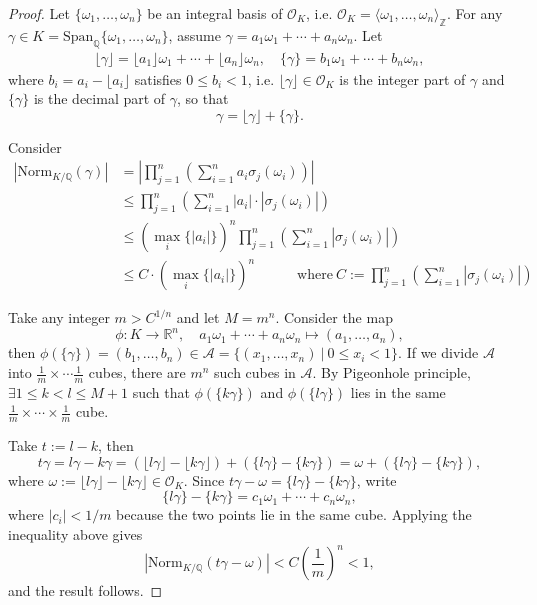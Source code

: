 \begin{proof}
    Let $\{\omega_{1},\dots, \omega_{n}\}$ be an integral basis of $\mathcal{O}_{K}$, i.e. $\mathcal{O}_{K}=\langle \omega_{1},\dots, \omega_{n}\rangle_{\mathbb{Z}}$. For any $\gamma\in K=\mathrm{Span}_{\mathbb{Q}}\{\omega_{1},\dots, \omega_{n}\}$, assume $\gamma=a_{1}\omega_{1}+\cdots+a_{n}\omega_{n}$. Let 
    \begin{align*}
    \lfloor \gamma \rfloor =\lfloor a_{1}\rfloor\omega_{1}+\cdots+\lfloor a_{n} \rfloor \omega_{n}, \quad \{\gamma\}=b_{1}\omega_{1}+\cdots+b_{n}\omega_{n},
    \end{align*}
    where $b_{i}=a_{i}-\lfloor a_{i}\rfloor $ satisfies $0\leq b_{i}<1$, i.e. $\lfloor \gamma \rfloor \in \mathcal{O}_K$ is the integer part of $\gamma$ and $\{\gamma\}$ is the decimal part of $\gamma$, so that $$\gamma=\lfloor\gamma\rfloor+\{\gamma\}.$$

    \medskip
    Consider
    \[ 
    \begin{aligned}
    \left| \mathrm{Norm}_{K /\mathbb{Q}}(\gamma) \right| &=\left| \prod_{j=1}^{n}(\sum_{i=1}^{n}a_{i}\sigma_{j}(\omega_{i})) \right|\\
    &\leq \prod_{j=1}^{n}(\sum_{i=1}^{n}\left| a_{i} \right| \cdot \left| \sigma_{j}(\omega_{i}) \right| )\\
    &\leq (\max_{i}\{\left| a_{i} \right|\})^{n}\prod_{j=1}^{n}(\sum_{i=1}^{n}\left| \sigma_{j}(\omega_{i}) \right|) \\
    & \leq C\cdot (\max_{i}\{\left| a_{i} \right| \})^{n}  \quad \quad \quad \text{where}\ \displaystyle C:=\prod_{j=1}^{n}(\sum_{i=1}^{n}\left| \sigma_{j}(\omega_{i}) \right| )
    \end{aligned}
    \]
     
    
    Take any integer $m>C^{1 /n}$ and let $M=m^{n}$. Consider the map 
    \[\phi:K\to \mathbb{R}^{n},\quad a_{1}\omega_{1}+\cdots+a_{n}\omega_{n}\mapsto (a_{1},\dots, a_{n}),\]
    then $\phi(\{\gamma\})=(b_{1},\dots,b_{n})\in \mathscr{A}=\{(x_{1},\dots, x_{n})\ |\ 0\leq x_{i}<1\}$. If we divide $\mathscr{A}$ into $\frac{1}{m}\times \cdots \frac{1}{m}$ cubes, there are $m^{n}$ such cubes in $\mathscr{A}$. By Pigeonhole principle, $\exists 1\leq k<l\leq M+1$ such that $\phi(\{k\gamma\})$ and $\phi(\{l\gamma\})$ lies in the same $\frac{1}{m}\times\cdots\times \frac{1}{m}$ cube. 
    
    Take $t:=l-k$, then 
    $$t\gamma=l\gamma-k\gamma=(\lfloor l\gamma\rfloor-\lfloor k\gamma\rfloor)+(\{l\gamma\}-\{k\gamma\}) =\omega + (\{l\gamma\}-\{k\gamma\}),$$ 
    where $\omega:=\lfloor l\gamma \rfloor -\lfloor k\gamma\rfloor \in \mathcal{O}_K$. Since $t\gamma-\omega=\{l\gamma\}-\{k\gamma\}$, write
    \[
    \{l\gamma\}-\{k\gamma\}=c_1\omega_1+\cdots+c_n\omega_n,
    \]
    where $|c_i|<1/m$ because the two points lie in the same cube. Applying the inequality above gives
    \[
    \left|\mathrm{Norm}_{K/\mathbb{Q}}(t\gamma-\omega)\right|
    <C\left(\frac1m\right)^n<1,
    \]
    and the result follows.
\end{proof}

